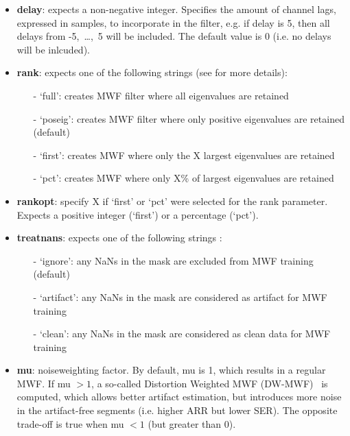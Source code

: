 \documentclass[11pt]{article}
\begin{document}
\begin{itemize}
\item \textbf{delay}: expects a non-negative integer. Specifies the amount of channel lags, expressed in samples, to incorporate in the filter, e.g. if delay is 5, then all delays from -5,~\ldots,~5 will be included. The default value is 0 (i.e. no delays will be inlcuded).

\item \textbf{rank}: expects one of the following strings (see \cite{somers2018generic} for more details):
\begin{itemize}
\item[-] `full': creates MWF filter where all eigenvalues are retained
\item[-] `poseig': creates MWF filter where only positive eigenvalues are retained (default)
\item[-] `first': creates MWF where only the X largest eigenvalues are retained
\item[-] `pct': creates MWF where only X\% of largest eigenvalues are retained
\end{itemize}

\item \textbf{rankopt}: specify X if `first' or `pct' were selected for the rank parameter. Expects a positive integer (`first') or a percentage (`pct').

\item \textbf{treatnans}: expects one of the following strings :
\begin{itemize}
\item[-] `ignore': any NaNs in the mask are excluded from MWF training (default)
\item[-] `artifact': any NaNs in the mask are considered as artifact for MWF training
\item[-] `clean': any NaNs in the mask are considered as clean data for MWF training
\end{itemize}

\item \textbf{mu}: noiseweighting factor. By default, mu is 1, which results in a regular MWF. If mu $> 1$, a so-called Distortion Weighted MWF (DW-MWF)~\cite{serizel2010integrated} is computed, which allows better artifact estimation, but introduces more noise in the artifact-free segments (i.e. higher ARR but lower SER). The opposite trade-off is true when mu $< 1$ (but greater than 0).

\end{itemize}
\end{document}
